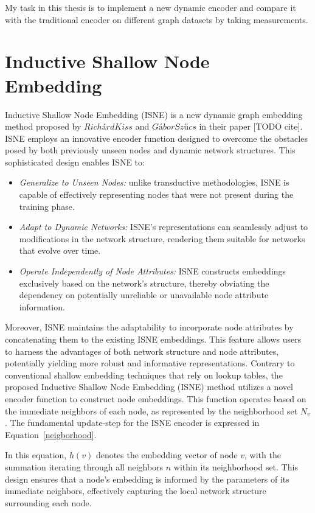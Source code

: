My task in this thesis is to implement a new dynamic encoder and compare it with the traditional encoder on different graph datasets by taking measurements. 

\section{Inductive Shallow Node Embedding}

Inductive Shallow Node Embedding (ISNE) is a new dynamic graph embedding method proposed by $Richárd Kiss$ and $Gábor Szűcs$ in their paper [TODO cite]. ISNE employs an innovative encoder function designed to overcome the obstacles posed by both previously unseen nodes and dynamic network structures. This sophisticated design enables ISNE to:

\begin{itemize}
    \item \emph{Generalize to Unseen Nodes:} unlike transductive methodologies, ISNE is capable of effectively representing nodes that were not present during the training phase.
    \item \emph{Adapt to Dynamic Networks:} ISNE's representations can seamlessly adjust to modifications in the network structure, rendering them suitable for networks that evolve over time.
    \item \emph{Operate Independently of Node Attributes:} ISNE constructs embeddings exclusively based on the network's structure, thereby obviating the dependency on potentially unreliable or unavailable node attribute information.
\end{itemize}

Moreover, ISNE maintains the adaptability to incorporate node attributes by concatenating them to the existing ISNE embeddings. This feature allows users to harness the advantages of both network structure and node attributes, potentially yielding more robust and informative representations. Contrary to conventional shallow embedding techniques that rely on lookup tables, the proposed Inductive Shallow Node Embedding (ISNE) method utilizes a novel encoder function to construct node embeddings. This function operates based on the immediate neighbors of each node, as represented by the neighborhood set $N_v$. The fundamental update-step for the ISNE encoder is expressed in Equation~\ref{neigborhood}.

\clearpage

In this equation, ${h(v)}$ denotes the embedding vector of node 
$v$, with the summation iterating through all neighbors 
$n$ within its neighborhood set. This design ensures that a node's embedding is informed by the parameters of its immediate neighbors, effectively capturing the local network structure surrounding each node.

